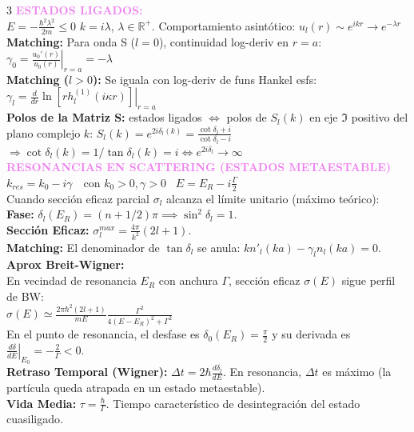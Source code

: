 \documentclass[8pt,a4paper,fleqn]{extarticle} %
\begin{document}
\begin{multicols}{3}
\textcolor{violet}{\textbf{ESTADOS LIGADOS:}}\\
$E = -\frac{\hbar^2 \lambda^2}{2m} \leq 0$\;\;\; $k=i\lambda$, $\lambda \in \mathbb{R}^+$. Comportamiento asintótico: $u_l(r) \sim e^{ikr} \to e^{-\lambda r}$\\
\textbf{Matching:} Para onda S ($l=0$), continuidad log-deriv en $r=a$: $\gamma_0 = \left. \frac{u_0'(r)}{u_0(r)} \right|_{r=a} = -\lambda$\\
\textbf{Matching ($l > 0$):} Se iguala con log-deriv de funs Hankel esfs: $\gamma_l = \left. \frac{d}{dr} \ln [r h_l^{(1)}(i\kappa r)] \right|_{r=a}$
\\
\textbf{Polos de la Matriz S:} estados ligados $\Leftrightarrow$ polos de $S_l(k)$ en eje $\Im$ positivo del plano complejo $k$: $S_l(k) = e^{2i\delta_l(k)} = \frac{\cot \delta_l + i}{\cot \delta_l - i}$ $\Rightarrow \cot \delta_l(k) = 1/\tan \delta_l (k) = i \Leftrightarrow e^{2i\delta_l} \to \infty$\\

\textcolor{violet}{\textbf{RESONANCIAS EN SCATTERING (ESTADOS METAESTABLE)}}\\
$k_{res} = k_0 - i\gamma \quad \text{con } k_0 > 0, \gamma > 0$ \,\;\;  $E = E_R - i\frac{\Gamma}{2}$\\
Cuando sección eficaz parcial $\sigma_l$ alcanza el límite unitario (máximo teórico):\\
\textbf{Fase:} $\delta_l(E_R) = (n + 1/2)\pi \implies \sin^2 \delta_l = 1$.\\
\textbf{Sección Eficaz:} $\sigma_l^{max} = \frac{4\pi}{k^2}(2l+1)$.
\\\textbf{Matching:} El denominador de $\tan \delta_l$ se anula: $k n'_l(ka) - \gamma_l n_l(ka) = 0$.\\
\textbf{Aprox Breit-Wigner:}\\
En vecindad de resonancia $E_R$ con anchura $\Gamma$, sección eficaz $\sigma(E)$ sigue perfil de BW:\\
$\sigma(E) \simeq \frac{2\pi\hbar^2(2l+1)}{mE} \frac{\Gamma^2}{4(E-E_R)^2 + \Gamma^2}$ \\
En el punto de resonancia, el desfase es $\delta_0(E_R) = \frac{\pi}{2}$ y su derivada es $\left.\frac{d\delta}{dE}\right|_{E_0} = -\frac{2}{\Gamma} < 0$.\\
\textbf{Retraso Temporal (Wigner):} $\Delta t = 2\hbar \frac{d\delta_l}{dE}$. En resonancia, $\Delta t$ es máximo (la partícula queda atrapada en un estado metaestable).\\
\textbf{Vida Media:} $\tau = \frac{\hbar}{\Gamma}$. Tiempo característico de desintegración del estado cuasiligado.


\end{multicols}
\end{document}
